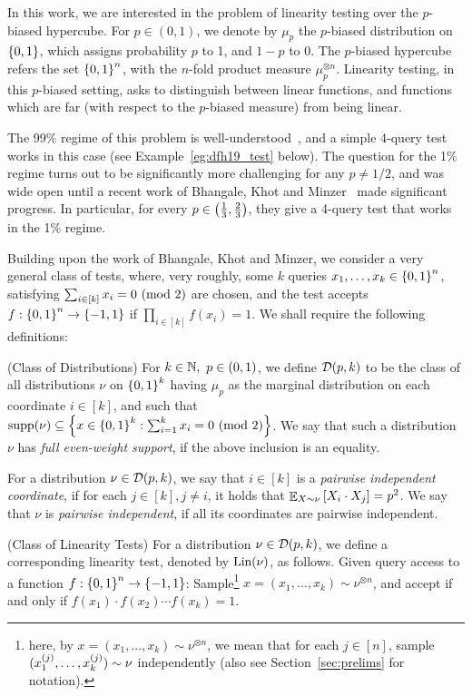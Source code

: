 In this work, we are interested in the problem of linearity testing over the $p$-biased hypercube.
For $p\in (0,1)$, we denote by $\mu_p$ the $p$-biased distribution on $\left\{ 0,1 \right\}$, which assigns probability $p$ to 1, and $1-p$ to 0.
The $p$-biased hypercube refers the set $\left\{ 0,1 \right\}^n$, with the $n$-fold product measure $\mu_p^{\otimes n}$.
Linearity testing, in this $p$-biased setting, asks to distinguish between linear functions, and functions which are far (with respect to the $p$-biased measure) from being linear.

The 99\% regime of this problem is well-understood~\cite{KS09, DFH19}, and a simple 4-query test works in this case (see Example~\ref{eg:dfh19_test} below).
The question for the 1\% regime turns out to be significantly more challenging for any $p\not= 1/2$, and was wide open until a recent work of Bhangale, Khot and Minzer~\cite{BKM23b} made significant progress.
In particular, for every $p\in \left( \frac{1}{3}, \frac{2}{3} \right)$, they give a 4-query test that works in the 1\% regime.

Building upon the work of Bhangale, Khot and Minzer, we consider a very general class of tests, where, very roughly, some $k$ queries $x_1,\dots, x_k \in \left\{ 0,1 \right\}^n$, satisfying $\sum_{i\in [k]}x_i = 0 \textnormal{ (mod 2)}$ are chosen, and the test accepts $f:\left\{ 0,1 \right\}^n\to \left\{ -1,1 \right\}$ if $\prod_{i\in [k]} f(x_i) = 1$.
We shall require the following definitions:

\begin{definition}\label{defn:distr_class} (Class of Distributions)
	For $k\in \mathbb{N},\ p\in (0,1)$, we define $\mathcal D(p,k)$ to be the class of all distributions $\nu$ on $\left\{ 0,1 \right\}^k$ having $\mu_p$ as the marginal distribution on each coordinate $i\in [k]$, and such that $\textnormal{supp}(\nu)\subseteq \left\{ x\in \left\{ 0,1 \right\}^k: \sum_{i=1}^kx_i = 0 \textnormal{ (mod 2)} \right\}$. 
	We say that such a distribution $\nu$ has \emph{full even-weight support}, if the above inclusion is an equality.
		
	For a distribution $\nu \in \mathcal D(p,k)$, we say that $i\in [k]$ is a \emph{pairwise independent coordinate}, if for each $j\in [k], j\not= i$, it holds that $\mathop{\mathbb{E}}_{X\sim \nu}\left[ X_i\cdot X_j \right] = p^2$.
	We say that $\nu$ is \emph{pairwise independent}, if all its coordinates are pairwise independent.
\end{definition} 

\begin{definition}\label{defn:lin_test} (Class of Linearity Tests)
	For a distribution $\nu \in \mathcal D(p,k)$, we define a corresponding linearity test, denoted by $\textnormal{Lin}(\nu)$, as follows.
	Given query access to a function $f:\left\{ 0,1 \right\}^n\to \left\{ -1,1 \right\}$:
	Sample\footnote{here, by $x = (x_1,\dots, x_k) \sim \nu^{\otimes n}$, we mean that for each $j\in [n]$, sample $(x_1^{\left( j \right)},\dots, x_k^{\left( j \right)})\sim \nu$ independently (also see Section~\ref{sec:prelims} for notation).} $x = (x_1,\dots, x_k) \sim \nu^{\otimes n}$, and accept if and only if $f(x_1)\cdot f(x_2)\cdots f(x_k) =1$.
\end{definition}

